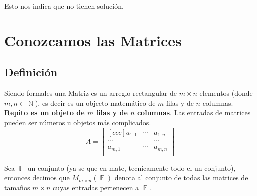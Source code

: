 \documentclass[12pt, fleqn]{report}                             %
\theoremstyle{break}                                            %
\DeclareMathOperator \Naturals     {\mathbb{N}}                 %
\DeclareMathOperator \GenericField {\mathbb{F}}                 %
\begin{document}
                Esto nos indica que no tienen solución.



    \chapter{Conozcamos las Matrices}



        \clearpage
        \section{Definición}

            Siendo formales una Matriz es un arreglo rectangular de $m \times n$ elementos 
            (donde $m,n \in \Naturals$), es decir es un objecto matemático de $m$ filas y
            de $n$ columnas. \textbf{Repito es un objeto de $m$ filas y de $n$ columnas}.
            Las entradas de matrices pueden ser números u objetos más complicados.
            \begin{equation*}
                A = 
                \begin{bmatrix}[ccc]
                    a _{1, 1}   & \cdots & a_{1,n}   \\
                    \cdots      &        & \cdots    \\
                    a _{m, 1}   & \cdots & a_{m,n}   \\
                \end{bmatrix}
            \end{equation*}
            
            Sea $\GenericField$ un conjunto (ya se que en mate, tecnicamente todo el un conjunto),
            entonces decimos que $M_{m \times n}(\GenericField)$ denota al conjunto de todas las
            matrices de tamaños $m \times n$ cuyas entradas pertenecen a $\GenericField$.


            \vspace{2em}
\end{document}
